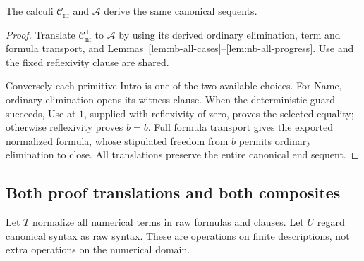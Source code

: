 \begin{proposition}
\label{prop:nb-canonical-choice}
The calculi $\mathcal C_{\mathrm{nf}}^+$ and $\mathcal A$ derive the
same canonical sequents.
\end{proposition}
\begin{proof}
Translate $\mathcal C_{\mathrm{nf}}^+$ to $\mathcal A$ by using its
derived ordinary elimination, term and formula transport, and
Lemmas~\ref{lem:nb-all-cases}--\ref{lem:nb-all-progress}. Use and the
fixed reflexivity clause are shared.

Conversely each primitive Intro is one of the two available choices.
For Name, ordinary elimination opens its witness clause. When the
deterministic guard succeeds, Use at $1$, supplied with reflexivity
of zero, proves the selected equality; otherwise reflexivity proves
$b=b$. Full formula transport gives the exported normalized formula,
whose stipulated freedom from $b$ permits ordinary elimination to
close. All translations preserve the entire canonical end sequent.
\end{proof}

\subsection{Both proof translations and both composites}

Let $T$ normalize all numerical terms in raw formulas and clauses.
Let $U$ regard canonical syntax as raw syntax. These are operations on
finite descriptions, not extra operations on the numerical domain.

